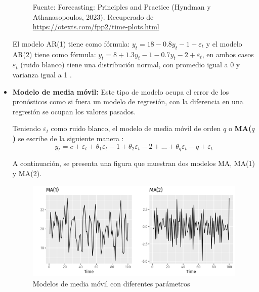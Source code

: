 \begin{itemize}
\begin{figure}[H]
        \begin{minipage}[t]{0.9\textwidth}
            Fuente: Forecasting: Principles and Practice (Hyndman y Athanasopoulos, 2023). Recuperado de \url{https://otexts.com/fpp2/time-plots.html}
        \end{minipage}
    \end{figure}

    El modelo AR(1) tiene como fórmula: $y_t=18-0.8y_t-1+\varepsilon_t$ y el modelo AR(2) tiene como fórmula: $y_t=8+1.3y_t-1 - 0.7y_t-2+\varepsilon_t$, en ambos casos $\varepsilon_t$ (ruido blanco) tiene una distribución normal, con promedio igual a 0 y varianza igual a 1 \cite{forecast-time-series-arima}.

    \item \textbf{Modelo de media móvil:} Este tipo de modelo ocupa el error de los pronósticos como si fuera un modelo de regresión, con la diferencia en una regresión se ocupan los valores pasados. 

    Teniendo $\varepsilon_t$ como ruido blanco, el modelo de media móvil de orden $q$ o \textbf{MA($q$)} se escribe de la siguiente manera \cite{forecast-time-series-arima}:
    \begin{equation*}
        y_t=c+\varepsilon_t+\theta_1\varepsilon_t-1+\theta_2\varepsilon_t-2+...+\theta_q\varepsilon_t-q+\varepsilon_t
    \end{equation*}

    A continuación, se presenta una figura que muestran dos modelos MA, MA(1) y MA(2).

    \begin{figure}[H]
        \begin{minipage}[t]{0.9\textwidth}
            \caption{Modelos de media móvil con diferentes parámetros}
            \label{MAmodel}        
        \end{minipage}
    
        \vspace{10pt}
    
        \begin{minipage}[b]{0.9\textwidth}
            \centering
            \includegraphics[width=\textwidth]{img/maq-1-example.png}        
        \end{minipage}
    

\end{figure}
\end{itemize}

